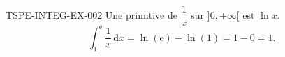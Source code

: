 \begin{corrige}{TSPE-INTEG-EX-002}
Une primitive de $\dfrac{1}{x}$ sur $]0,+\infty[$ est $\ln x$.
\[
  \int_1^{\mathrm{e}} \frac{1}{x}\,\mathrm{d}x = \ln(\mathrm{e}) - \ln(1) = 1 - 0 = \boxed{1}.
\]
\end{corrige}
